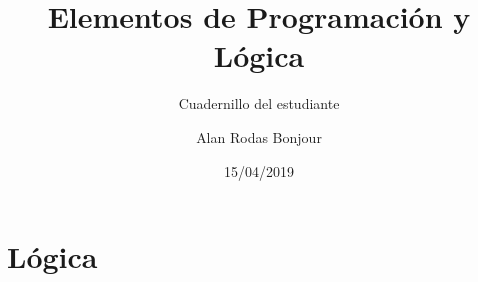 \documentclass[11pt,fleqn]{book} %
\begin{document}

\title{Elementos de Programación y Lógica}
\subtitle{Cuadernillo del estudiante}
\author{Alan Rodas Bonjour}
\date{15/04/2019}


\maketitle





\setlength{\parskip}{0.5em}




\part{Lógica}
\label{Lógica}


%



%
%


\end{document}
